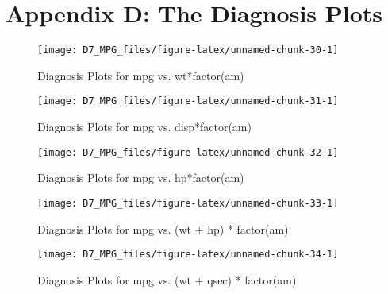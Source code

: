 \documentclass[]{article}
\begin{document}
\hypertarget{app-diag}{\section*{Appendix D: The Diagnosis
Plots}\label{app-diag}}

\begin{figure}[H]

{\centering \texttt{[image: D7\_MPG\_files/figure-latex/unnamed-chunk-30-1]} 

}

\caption{\label{fig:diag-1-wt}Diagnosis Plots for mpg vs. wt*factor(am)}\label{fig:unnamed-chunk-30}
\end{figure}

\begin{figure}[H]

{\centering \texttt{[image: D7\_MPG\_files/figure-latex/unnamed-chunk-31-1]} 

}

\caption{\label{fig:diag-1-disp}Diagnosis Plots for mpg vs. disp*factor(am)}\label{fig:unnamed-chunk-31}
\end{figure}

\begin{figure}[H]

{\centering \texttt{[image: D7\_MPG\_files/figure-latex/unnamed-chunk-32-1]} 

}

\caption{\label{fig:diag-1-hp}Diagnosis Plots for mpg vs. hp*factor(am)}\label{fig:unnamed-chunk-32}
\end{figure}

\begin{figure}[H]

{\centering \texttt{[image: D7\_MPG\_files/figure-latex/unnamed-chunk-33-1]} 

}

\caption{\label{fig:diag-2-hp}Diagnosis Plots for mpg vs. (wt + hp) * factor(am)}\label{fig:unnamed-chunk-33}
\end{figure}

\begin{figure}[H]

{\centering \texttt{[image: D7\_MPG\_files/figure-latex/unnamed-chunk-34-1]} 

}

\caption{\label{fig:diag-2-qsec}Diagnosis Plots for mpg vs. (wt + qsec) * factor(am)}\label{fig:unnamed-chunk-34}
\end{figure}
\end{document}
